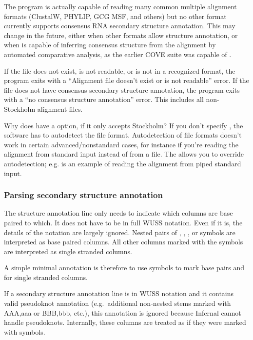 The program is actually capable of reading many common multiple
alignment formats (ClustalW, PHYLIP, GCG MSF, and others) but no other
format currently supports consensus RNA secondary structure
annotation. This may change in the future, either when other formats
allow structure annotation, or when  is capable of
inferring consensus structure from the alignment by automated
comparative analysis, as the earlier COVE suite was capable
of \citep{Eddy94}. 

If the file does not exist, is not readable, or is not in a recognized
format, the program exits with a ``Alignment file doesn't exist or is
not readable'' error. If the file does not have consensus secondary
structure annotation, the program exits with a ``no consensus
structure annotation'' error. This includes all non-Stockholm
alignment files.

\begin{srefaq}{Why does  have a  option, if it only
accepts Stockholm?} If you don't specify , the
software has to autodetect the file format. Autodetection of file
formats doesn't work in certain advanced/nonstandard cases, for
instance if you're reading the alignment from standard input instead
of from a file. The  allows you to override
autodetection; e.g.  is an example of reading the alignment from piped standard
input.
\end{srefaq}

\subsubsection{Parsing secondary structure annotation}

The structure annotation line only needs to indicate which columns are
base paired to which. It does not have to be in full WUSS notation.
Even if it is, the details of the notation are largely ignored.
Nested pairs of \otext{<>}, \otext{()}, \otext{[]}, or \otext{{}} symbols
are interpreted as base paired columns. All other columns marked with
the symbols  are interpreted as single stranded columns.

A simple minimal annotation is therefore to use \otext{<>} symbols to
mark base pairs and  for single stranded columns.

If a secondary structure annotation line is in WUSS notation and it
contains valid pseudoknot annotation (e.g.\ additional non-nested
stems marked with AAA,aaa or BBB,bbb, etc.), this annotation is
ignored because Infernal cannot handle
pseudoknots. Internally, these columns are treated as if they were
marked with  symbols.

